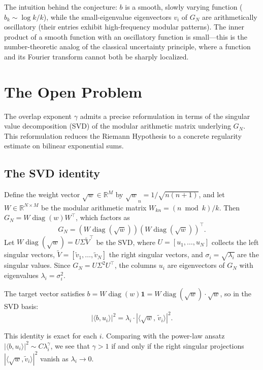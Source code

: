 \documentclass[11pt,a4paper]{article}
\begin{document}
The intuition behind the conjecture: $b$ is a smooth, slowly varying function ($b_k \sim \log k / k$), while the small-eigenvalue eigenvectors $v_i$ of $G_N$ are arithmetically oscillatory (their entries exhibit high-frequency modular patterns). The inner product of a smooth function with an oscillatory function is small---this is the number-theoretic analog of the classical uncertainty principle, where a function and its Fourier transform cannot both be sharply localized.

\section{The Open Problem}

The overlap exponent $\gamma$ admits a precise reformulation in terms of the singular value decomposition (SVD) of the modular arithmetic matrix underlying $G_N$. This reformulation reduces the Riemann Hypothesis to a concrete regularity estimate on bilinear exponential sums.

\subsection{The SVD identity}

Define the weight vector $\sqrt{w} \in \mathbb{R}^M$ by $\sqrt{w}_n = 1/\sqrt{n(n+1)}$, and let $W \in \mathbb{R}^{N \times M}$ be the modular arithmetic matrix $W_{kn} = (n \bmod k)/k$. Then $G_N = W \operatorname{diag}(w) W^\top$, which factors as
\[
G_N = (W \operatorname{diag}(\sqrt{w}))(W \operatorname{diag}(\sqrt{w}))^\top.
\]
Let $W \operatorname{diag}(\sqrt{w}) = U \Sigma \tilde{V}^\top$ be the SVD, where $U = [u_1, \ldots, u_N]$ collects the left singular vectors, $\tilde{V} = [\tilde{v}_1, \ldots, \tilde{v}_N]$ the right singular vectors, and $\sigma_i = \sqrt{\lambda_i}$ are the singular values. Since $G_N = U \Sigma^2 U^\top$, the columns $u_i$ are eigenvectors of $G_N$ with eigenvalues $\lambda_i = \sigma_i^2$.

The target vector satisfies $b = W \operatorname{diag}(w) \mathbf{1} = W \operatorname{diag}(\sqrt{w}) \cdot \sqrt{w}$, so in the SVD basis:
\begin{equation}\label{eq:svd-identity}
|\langle b, u_i \rangle|^2 = \lambda_i \cdot |\langle \sqrt{w},\, \tilde{v}_i \rangle|^2.
\end{equation}

This identity is exact for each $i$. Comparing with the power-law ansatz $|\langle b, u_i \rangle|^2 \sim C \lambda_i^{\gamma}$, we see that $\gamma > 1$ if and only if the right singular projections $|\langle \sqrt{w}, \tilde{v}_i \rangle|^2$ vanish as $\lambda_i \to 0$.
\end{document}
